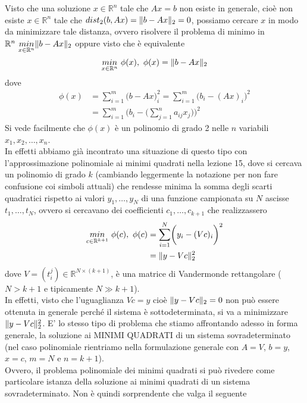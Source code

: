\documentclass[12pt,a4paper]{article}
\DeclarePairedDelimiter{\norma}{\lVert}{\rVert}
\begin{document}
Visto che una soluzione $x \in \mathbb{R}^n$ tale che $Ax=b$ non esiste in generale, cioè non esiste $x \in \mathbb{R}^n$ tale che $dist_2(b,Ax)=\norma{b-Ax}_2 = 0$, possiamo cercare $x$ in modo da minimizzare tale distanza, ovvero risolvere il problema di minimo in $\mathbb{R}^n \ \underset{x\in \mathbb{R}^n}{min} \norma{b-Ax}_2 $ oppure visto che è equivalente
\begin{equation*}
    \underset{x\in \mathbb{R}^n}{min} \ \phi(x), \ \phi(x)=\norma{b-Ax}_2
\end{equation*}
dove
\begin{equation*}
    \begin{split}
        \phi(x) & = \sum_{i=1}^m \biggl(b-Ax\biggr)_i^2 = \sum_{i=1}^m \biggl(b_i - (Ax)_i\biggr)^2 \\
        & = \sum_{i=1}^m \biggl(b_i - \biggl( \sum_{j=1}^n a_{ij}x_j \biggr) \biggr)^2
    \end{split}
\end{equation*}
Si vede facilmente che $\phi(x)$ è un polinomio di grado 2 nelle $n$ variabili $x_1, x_2, \dots, x_n$. \\
In effetti abbiamo già incontrato una situazione di questo tipo con l'approssimazione polinomiale ai minimi quadrati nella lezione 15, dove si cercava un polinomio di grado $k$ (cambiando leggermente la notazione per non fare confusione coi simboli attuali) che rendesse minima la somma degli scarti quadratici rispetto ai valori $y_1,\dots,y_N$ di una funzione campionata su $N$ ascisse $t_1,\dots,t_N$, ovvero si cercavano dei coefficienti $c_1,\dots,c_{k+1}$ che realizzassero
\begin{equation*}
    \begin{split}
        \underset{c\in \mathbb{R}^{k+1}}{min} \ \phi(c), \ \phi(c) & = \sum_ {i=1}^N \biggl( y_i - (Vc)_i \biggr)^2 \\
        & = \norma{y-Vc}_2^2
    \end{split}
\end{equation*}
dove $V=(t_i^j) \in \mathbb{R}^{N\times (k+1)}$, è una matrice di Vandermonde rettangolare ($N>k+1$ e tipicamente $N\gg k+1$). \\
In effetti, visto che l'uguaglianza $Vc=y$ cioè $\norma{y-Vc}_2=0$ non può essere ottenuta in generale perché il sistema è sottodeterminata, si va a minimizzare $\norma{y-Vc}_2^2$. E' lo stesso tipo di problema che stiamo affrontando adesso in forma generale, la soluzione ai MINIMI QUADRATI di un sistema sovradeterminato (nel caso polinomiale rientriamo nella formulazione generale con $A=V$, $b=y$, $x=c$, $m=N$ e $n=k+1$).\\
Ovvero, il problema polinomiale dei minimi quadrati si può rivedere come particolare istanza della soluzione ai minimi quadrati di un sistema sovradeterminato. Non è quindi sorprendente che valga il seguente
\end{document}
